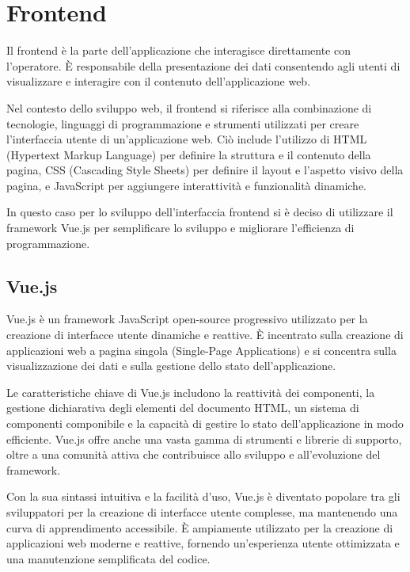 \section{Frontend}
Il frontend è la parte dell’applicazione che interagisce direttamente con 
l’operatore. È responsabile della presentazione dei dati consentendo agli 
utenti di visualizzare e interagire con il contenuto dell'applicazione web.

Nel contesto dello sviluppo web, il frontend si riferisce alla combinazione 
di tecnologie, linguaggi di programmazione e strumenti utilizzati per creare 
l'interfaccia utente di un'applicazione web. Ciò include l'utilizzo di HTML 
(Hypertext Markup Language) per definire la struttura e il contenuto della 
pagina, CSS (Cascading Style Sheets) per definire il layout e l'aspetto 
visivo della pagina, e JavaScript per aggiungere interattività e funzionalità 
dinamiche.

In questo caso per lo sviluppo dell’interfaccia frontend si è deciso di 
utilizzare il framework Vue.js per semplificare lo sviluppo e migliorare 
l'efficienza di programmazione.

\subsection{Vue.js}
Vue.js è un framework JavaScript open-source progressivo utilizzato per la creazione di 
interfacce utente dinamiche e reattive. È incentrato sulla creazione di 
applicazioni web a pagina singola (Single-Page Applications) e si concentra 
sulla visualizzazione dei dati e sulla gestione dello stato dell'applicazione.

Le caratteristiche chiave di Vue.js includono la reattività dei componenti, 
la gestione dichiarativa degli elementi del documento HTML, un sistema di 
componenti componibile e la capacità di gestire lo stato dell'applicazione in 
modo efficiente. Vue.js offre anche una vasta gamma di strumenti e librerie di 
supporto, oltre a una comunità attiva che contribuisce allo sviluppo e 
all'evoluzione del framework.

Con la sua sintassi intuitiva e la facilità d'uso, Vue.js è diventato popolare 
tra gli sviluppatori per la creazione di interfacce utente complesse, ma 
mantenendo una curva di apprendimento accessibile. È ampiamente utilizzato per 
la creazione di applicazioni web moderne e reattive, fornendo un'esperienza 
utente ottimizzata e una manutenzione semplificata del codice. 
~\cite{wiki:vuejs}\\



